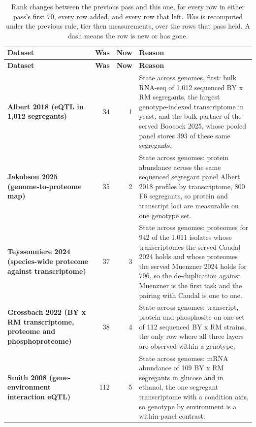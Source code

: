\begingroup
\footnotesize
\setlength{\tabcolsep}{4pt}
\renewcommand{\arraystretch}{1.15}
\begin{longtable}{@{}L{46mm} r@{\hspace{6pt}} r@{\hspace{6pt}} L{104mm}@{}}
\caption[]{Rank changes between the previous pass and this one, for every row in
either pass's first 70, every row added, and every row that left.
\emph{Was} is recomputed under the previous rule, tier then measurements, over the
rows that pass held. A dash means the row is new or has gone.}
\label{tab:swaps}\\
\toprule
\textbf{Dataset} & \textbf{Was} & \textbf{Now} & \textbf{Reason} \\
\midrule
\endfirsthead
\toprule
\textbf{Dataset} & \textbf{Was} & \textbf{Now} & \textbf{Reason} \\
\midrule
\endhead
\bottomrule
\endfoot
\textbf{Albert 2018 (eQTL in 1,012 segregants)} & 34 & 1 & State across genomes, first: bulk RNA-seq of 1,012 sequenced BY x RM segregants, the largest genotype-indexed transcriptome in yeast, and the bulk partner of the served Boocock 2025, whose pooled panel stores 393 of these same segregants. \\
\addlinespace[5pt]
\textbf{Jakobson 2025 (genome-to-proteome map)} & 35 & 2 & State across genomes: protein abundance across the same sequenced segregant panel Albert 2018 profiles by transcriptome, 800 F6 segregants, so protein and transcript loci are measurable on one genotype set. \\
\addlinespace[5pt]
\textbf{Teyssonniere 2024 (species-wide proteome against transcriptome)} & 37 & 3 & State across genomes: proteomes for 942 of the 1,011 isolates whose transcriptomes the served Caudal 2024 holds and whose proteomes the served Muenzner 2024 holds for 796, so the de-duplication against Muenzner is the first task and the pairing with Caudal is one to one. \\
\addlinespace[5pt]
\textbf{Grossbach 2022 (BY x RM transcriptome, proteome and phosphoproteome)} & 38 & 4 & State across genomes: transcript, protein and phosphosite on one set of 112 sequenced BY x RM strains, the only row where all three layers are observed within a genotype. \\
\addlinespace[5pt]
\textbf{Smith 2008 (gene-environment interaction eQTL)} & 112 & 5 & State across genomes: mRNA abundance of 109 BY x RM segregants in glucose and in ethanol, the one segregant transcriptome with a condition axis, so genotype by environment is a within-panel contrast. \\

\end{longtable}
